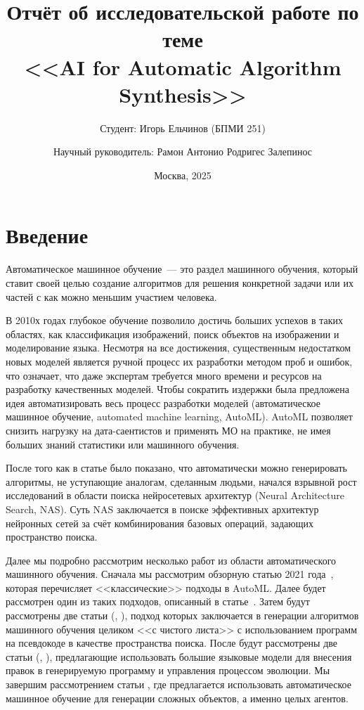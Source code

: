 \documentclass[a4paper,14pt]{extarticle}
\title{Отчёт об исследовательской работе по теме \\
<<AI for Automatic Algorithm Synthesis>>}
\author{Студент: Игорь Ельчинов (БПМИ 251) \and Научный руководитель: Рамон Антонио Родригес Залепинос}
\date{Москва, 2025}
\begin{document}
\maketitle

\newpage

\tableofcontents

\newpage
\section{Введение}
    Автоматическое машинное обучение~--- это раздел машинного обучения, который ставит своей целью создание алгоритмов для решения конкретной задачи или их частей с как можно меньшим участием человека.

    В 2010х годах глубокое обучение позволило достичь больших успехов в таких областях, как классификация изображений, поиск объектов на изображении и моделирование языка.
    Несмотря на все достижения, существенным недостатком новых моделей является ручной процесс их разработки методом проб и ошибок, что означает, что даже экспертам требуется много времени и ресурсов на разработку качественных моделей.
    Чтобы сократить издержки была предложена идея автоматизировать весь процесс разработки моделей (автоматическое машинное обучение, automated machine learning, AutoML).
    AutoML позволяет снизить нагрузку на дата-саентистов и применять МО на практике, не имея больших знаний статистики или машинного обучения. 

    После того как в статье \cite{bibl:first-automl} было показано, что автоматически можно генерировать алгоритмы, не уступающие аналогам, сделанным людьми, начался взрывной рост исследований в области поиска нейросетевых архитектур (Neural Architecture Search, NAS).
    Суть NAS заключается в поиске эффективных архитектур нейронных сетей за счёт комбинирования базовых операций, задающих пространство поиска.

    Далее мы подробно рассмотрим несколько работ из области автоматического машинного обучения.
    Сначала мы рассмотрим обзорную статью 2021 года~\cite{bibl:sota}, которая перечисляет <<классические>> подходы в AutoML.
    Далее будет рассмотрен один из таких подходов, описанный в статье~\cite{bibl:evolved-transformer}.
    Затем будут рассмотрены две статьи (\cite{bibl:az}, \cite{bibl:moaz}), подход которых заключается в генерации алгоритмов машинного обучения целиком <<с чистого листа>> с использованием программ на псевдокоде в качестве пространства поиска.
    После будут рассмотрены две статьи (\cite{bibl:shinkaevolve}, \cite{bibl:alphaevolve}), предлагающие использовать большие языковые модели для внесения правок в генерируемую программу и управления процессом эволюции.
    Мы завершим рассмотрением статьи \cite{bibl:adas}, где предлагается использовать автоматическое машинное обучение для генерации сложных объектов, а именно целых агентов.
\end{document}
